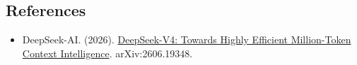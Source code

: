 \FloatBarrier
{}
\hypertarget{references-106}{%
\subsection{References}\label{references-106}}

\vspace{0.25em}
\begin{itemize}
\tightlist
\item
  DeepSeek-AI. (2026). \href{https://arxiv.org/abs/2606.19348}{DeepSeek-V4: Towards Highly Efficient Million-Token Context Intelligence}. arXiv:2606.19348.
\end{itemize}

\clearpage
